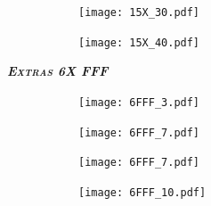 \documentclass[aspectratio=169,xcolor=dvipsnames,t]{beamer}
\begin{document}
\begin{frame}
      \vspace{1cm}
      \begin{figure}
            \centering
            \begin{subfigure}[b]{0.49\linewidth}
                  \texttt{[image: 15X\_30.pdf]}
            \end{subfigure}
            \begin{subfigure}[b]{0.49\linewidth}
                  \texttt{[image: 15X\_40.pdf]}
            \end{subfigure}
      \end{figure}
\end{frame}



\begin{frame}[standout]
      \centering\LARGE
      \textbf{\itshape\scshape Extras 6X FFF}
\end{frame}

\begin{frame}
      \vspace{1cm}
      \begin{figure}
            \centering
            \begin{subfigure}[b]{0.49\linewidth}
                  \texttt{[image: 6FFF\_3.pdf]}
            \end{subfigure}
            \begin{subfigure}[b]{0.49\linewidth}
                  \texttt{[image: 6FFF\_7.pdf]}
            \end{subfigure}
      \end{figure}
\end{frame}

\begin{frame}
      \vspace{1cm}
      \begin{figure}
            \centering
            \begin{subfigure}[b]{0.49\linewidth}
                  \texttt{[image: 6FFF\_7.pdf]}
            \end{subfigure}
            \begin{subfigure}[b]{0.49\linewidth}
                  \texttt{[image: 6FFF\_10.pdf]}
            \end{subfigure}
      \end{figure}
\end{frame}
\end{document}
